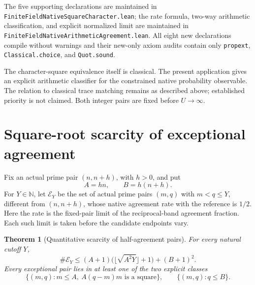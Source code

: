 \documentclass[11pt]{article}
\newtheorem{theorem}{Theorem}[section]
\begin{document}
The five supporting declarations are maintained in
\texttt{FiniteFieldNativeSquareCharacter.\allowbreak lean}; the rate formula,
two-way arithmetic classification, and explicit normalized limit
are maintained in \texttt{FiniteFieldNativeArithmeticAgreement.\allowbreak lean}.
All eight new declarations compile without warnings and their
new-only axiom audits contain only \texttt{propext},
\texttt{Classical.choice}, and \texttt{Quot.sound}.

The character-square equivalence itself is classical. The present
application gives an explicit arithmetic classifier for the
constrained native probability observable. The relation to classical
trace matching remains as described above; established priority is
not claimed. Both integer pairs are fixed before \(U\to\infty\).

\section{Square-root scarcity of exceptional agreement}
\label{sec:native-exception-count}
Fix an actual prime pair \((n,n+h)\), with \(h>0\), and put
\[
                         A=hn,\qquad B=h(n+h).
\]
For \(Y\in\mathbb N\), let \(\mathcal E_Y\) be the set of actual prime
pairs \((m,q)\) with \(m<q\le Y\), different from \((n,n+h)\), whose
native agreement rate with the reference is \(1/2\).
Here the rate is the fixed-pair limit of the reciprocal-band
agreement fraction. Each such limit is taken before the candidate
endpoints vary.

\begin{theorem}[Quantitative scarcity of half-agreement pairs]
\label{thm:native-exception-count}
For every natural cutoff \(Y\),
\begin{equation}\label{eq:native-exception-count}
 \#\mathcal E_Y
 \le (A+1)\bigl(\lfloor\sqrt{A^2Y}\rfloor+1\bigr)+(B+1)^2.
\end{equation}
Every exceptional pair lies in at least one of the two explicit classes
\[
 \bigl\{(m,q):m\le A,\ A(q-m)m\text{ is a square}\bigr\},
 \qquad
 \bigl\{(m,q):q\le B\bigr\}.
\]
\end{theorem}
\end{document}
